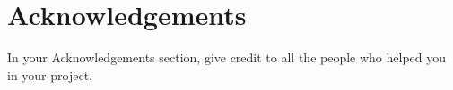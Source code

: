 \documentclass[]{UCD_CS_FYP_Report}
\begin{document}
%


\chapter*{Acknowledgements}
In your Acknowledgements section, give credit to all the people who helped you in your project.


\printbibliography


\end{document}
